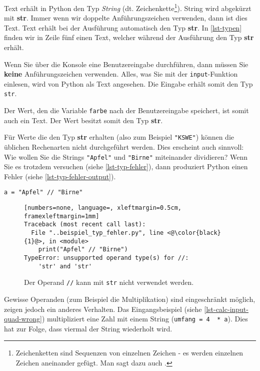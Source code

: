 Text erhält in Python den Typ \textit{String} (dt. Zeichenkette\footnote{Zeichenketten sind Sequenzen von einzelnen Zeichen - es werden einzelnen Zeichen aneinander gefügt. Man sagt dazu auch .}). String wird abgekürzt mit \textbf{str}. Immer wenn wir doppelte Anführungszeichen verwenden, dann ist dies Text. Text erhält bei der Ausführung automatisch den Typ \textbf{str}. In \autoref{lst-typen} finden wir in Zeile fünf einen Text, welcher während der Ausführung den Typ \textbf{str} erhält.

\begin{important}
Wenn Sie über die Konsole eine Benutzereingabe durchführen, dann müssen Sie \textbf{keine} Anführungszeichen verwenden. Alles, was Sie mit der \lstinline{input}-Funktion einlesen, wird von Python als Text angesehen. Die Eingabe erhält somit den Typ \lstinline{str}.
\end{important}

Der Wert, den die Variable \lstinline{farbe} nach der Benutzereingabe speichert, ist somit auch ein Text. Der Wert besitzt somit den Typ \textbf{str}.

Für Werte die den Typ \textbf{str} erhalten (also zum Beispiel \lstinline{"KSWE"}) können die üblichen Rechenarten nicht durchgeführt werden. Dies erscheint auch sinnvoll: Wie wollen Sie die Strings \lstinline{"Apfel"} und \lstinline{"Birne"} miteinander dividieren? Wenn Sie es trotzdem versuchen (siehe \autoref{lst-typ-fehler}), dann produziert Python einen Fehler (siehe \autoref{lst-typ-fehler-output}).

\begin{lstlisting}[caption={Code-Gerüst (\graybgtexttt{beispiel\_typ\_fehler.py}).}, label=lst-typ-fehler, showstringspaces=false]
a = "Apfel" // "Birne"
\end{lstlisting}

\begin{figure}[htb]
\centering
\begin{lstlisting}[numbers=none, language=, xleftmargin=0.5cm, framexleftmargin=1mm]
Traceback (most recent call last):
  File "..beispiel_typ_fehler.py", line <@\color{black}{1}@>, in <module>
    print("Apfel" // "Birne")
TypeError: unsupported operand type(s) for //: 
	'str' and 'str'
\end{lstlisting}
\caption{Der Operand \texttt{//} kann mit \texttt{str} nicht verwendet werden.}
\label{lst-typ-fehler-output}
\end{figure}

Gewisse Operanden (zum Beispiel die Multiplikation) sind eingeschränkt möglich, zeigen jedoch ein anderes Verhalten. Das Eingangsbeispiel (siehe \autoref{lst-calc-input-quad-wrong}) multipliziert eine Zahl mit einem String (\lstinline{umfang = 4  * a}). Dies hat zur Folge, dass viermal der String wiederholt wird.

